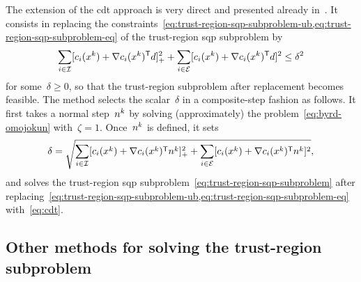 The extension of the \gls{cdt} approach is very direct and presented already in~\cite[\S~15.4.4]{Conn_Gould_Toint_2000}.
It consists in replacing the constraints~\cref{eq:trust-region-sqp-subproblem-ub,eq:trust-region-sqp-subproblem-eq} of the trust-region \gls{sqp} subproblem by
\begin{equation}
    \label{eq:cdt}
    \sum_{i \in \iub} \posp{\con{i}(\iter[k]) + \nabla \con{i}(\iter[k])^{\T} \step}^2 + \sum_{i \in \ieq} [\con{i}(\iter[k]) + \nabla \con{i}(\iter[k])^{\T} \step]^2 \le \delta^2
\end{equation}
for some~$\delta \ge 0$, so that the trust-region subproblem after replacement becomes feasible.
The method selects the scalar~$\delta$ in a composite-step fashion as follows.
It first takes a normal step~$\nstep[k]$ by solving (approximately) the problem~\cref{eq:byrd-omojokun} with~$\zeta = 1$.
Once~$\nstep[k]$ is defined, it sets
\begin{equation*}
    \delta = \sqrt{\sum_{i \in \iub} \posp{\con{i}(\iter[k]) + \nabla \con{i}(\iter[k])^{\T} \nstep[k]}^2 + \sum_{i \in \ieq} [\con{i}(\iter[k]) + \nabla \con{i}(\iter[k])^{\T} \nstep[k]]^2},
\end{equation*}
and solves the trust-region \gls{sqp} subproblem~\cref{eq:trust-region-sqp-subproblem} after replacing~\cref{eq:trust-region-sqp-subproblem-ub,eq:trust-region-sqp-subproblem-eq} with~\cref{eq:cdt}.

\subsection{Other methods for solving the trust-region  subproblem}

